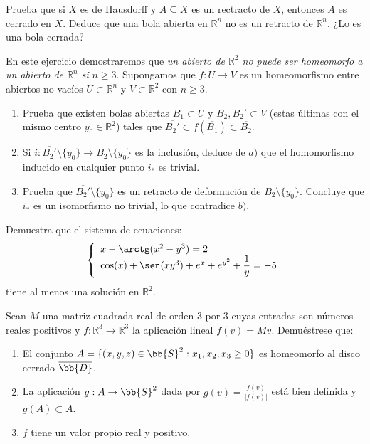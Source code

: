 \begin{ejercicio}
    Prueba que si $X$ es de Hausdorff y $A\subseteq X$ es un rectracto de $X$, entonces $A$ es cerrado en $X$. Deduce que una bola abierta en $\mathbb{R}^n$ no es un retracto de $\mathbb{R}^n$. ¿Lo es una bola cerrada?
\end{ejercicio}

\begin{ejercicio}
    En este ejercicio demostraremos que \textit{un abierto de $\mathbb{R}^2$ no puede ser homeomorfo a un abierto de $\mathbb{R}^n$ si} $n\geq 3$. Supongamos que $f:U\to V$ es un homeomorfismo entre abiertos no vacíos $U\subset \mathbb{R}^n$ y $V\subset \mathbb{R}^2$ con $n\geq 3$.
    \begin{enumerate}[label=\alph*)]
        \item Prueba que existen bolas abiertas $B_1\subset U$ y $B_2,B_2'\subset V$ (estas últimas con el mismo centro $y_0\in \mathbb{R}^2$) tales que $\overline{B_2'}\subset f(\overline{B_1})\subset \overline{B_2}$.
        \item Si $i:\overline{B_2'}\setminus \{y_0\}\to \overline{B_2}\setminus \{y_0\}$ es la inclusión, deduce de $a)$ que el homomorfismo inducido en cualquier punto $i_\ast$ es trivial.
        \item Prueba que $\overline{B_2'}\setminus \{y_0\}$ es un retracto de deformación de $\overline{B_2}\setminus \{y_0\}$. Concluye que $i_\ast$ es un isomorfismo no trivial, lo que contradice $b)$.
    \end{enumerate}
\end{ejercicio}

\begin{ejercicio}
    Demuestra que el sistema de ecuaciones:
    \begin{equation*}
        \left\{\begin{array}{l}
            x-\arctg(x^2-y^3) = 2 \\
            \cos(x) + \sen(xy^3) + e^x + e^{y^2} + \dfrac{1}{y} = -5
        \end{array}\right.
    \end{equation*}
    tiene al menos una solución en $\mathbb{R}^2$.
\end{ejercicio}

\begin{ejercicio}
    Sean $M$ una matriz cuadrada real de orden 3 por 3 cuyas entradas son números reales positivos
    y $f:\mathbb{R}^3\to \mathbb{R}^3$ la aplicación lineal $f(v)=Mv$. Demuéstrese que:
    \begin{enumerate}[label=\alph*)]
        \item El conjunto $A=\{(x,y,z)\in \bb{S}^2:x_1,x_2,x_3\geq 0\}$ es homeomorfo al disco cerrado $\overline{\bb{D}}$.
        \item La aplicación $g:A\to \bb{S}^2$ dada por $g(v) = \frac{f(v)}{|f(v)|}$ está bien definida y $g(A)\subset A$.
        \item $f$ tiene un valor propio real y positivo.
    \end{enumerate}
\end{ejercicio}

